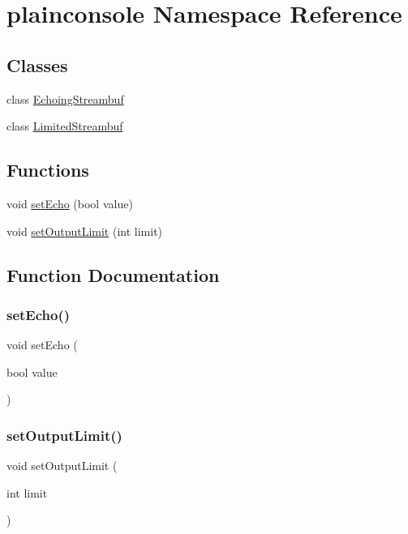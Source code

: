 \hypertarget{namespaceplainconsole}{}\section{plainconsole Namespace Reference}
\label{namespaceplainconsole}
\subsection*{Classes}
\begin{DoxyCompactItemize}
\item 
class \mbox{\hyperlink{classplainconsole_1_1EchoingStreambuf}{Echoing\+Streambuf}}
\item 
class \mbox{\hyperlink{classplainconsole_1_1LimitedStreambuf}{Limited\+Streambuf}}
\end{DoxyCompactItemize}
\subsection*{Functions}
\begin{DoxyCompactItemize}
\item 
void \mbox{\hyperlink{namespaceplainconsole_ab5c6852f3043d19153277c58603ee1e8}{set\+Echo}} (bool value)
\item 
void \mbox{\hyperlink{namespaceplainconsole_a95494ab13d3acc239eda093a209f4db4}{set\+Output\+Limit}} (int limit)
\end{DoxyCompactItemize}


\subsection{Function Documentation}
\mbox{\label{namespaceplainconsole_ab5c6852f3043d19153277c58603ee1e8}} 
\subsubsection{\texorpdfstring{set\+Echo()}{setEcho()}}
{\footnotesize\ttfamily void set\+Echo (\begin{DoxyParamCaption}\item[{bool}]{value }\end{DoxyParamCaption})}

\mbox{\label{namespaceplainconsole_a95494ab13d3acc239eda093a209f4db4}} 
\subsubsection{\texorpdfstring{set\+Output\+Limit()}{setOutputLimit()}}
{\footnotesize\ttfamily void set\+Output\+Limit (\begin{DoxyParamCaption}\item[{int}]{limit }\end{DoxyParamCaption})}

